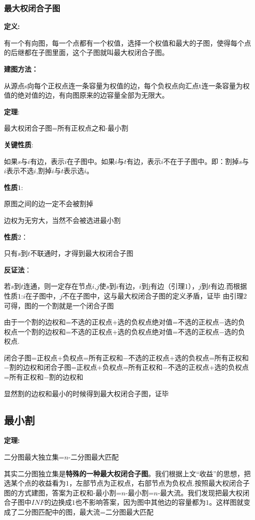 \documentclass[12pt, a4paper, oneside]{ctexart}
\begin{document}
\subsubsection{最大权闭合子图}
\textbf{定义:}
\par
\qquad  有一个有向图，每一个点都有一个权值，选择一个权值和最大的子图，使得每个点的后继都在子图里面，这个子图就叫最大权闭合子图。\par
\textbf{建图方法：}
\par
\qquad  从源点s向每个正权点连一条容量为权值的边，每个负权点向汇点t连一条容量为权值的绝对值的边，有向图原来的边容量全部为无限大。\par
\textbf{定理}:
\par
\qquad  最大权闭合子图=所有正权点之和-最小割\par
\textbf{关键性质}:
\par
\qquad  如果$s$与$i$有边，表示$i$在子图中。如果$i$与$t$有边，表示$i$不在于子图中。即：割掉$s$与$i$表示不选$i$,割掉$i$与$t$表示选$i$。\par
\textbf{性质$1$}:
\par
\qquad  原图之间的边一定不会被割掉\par
 边权为无穷大，当然不会被选进最小割\par
\textbf{性质$2$}：
\par
\qquad  只有$s$到$t$不联通时，才得到最大权闭合子图\par
\textbf{反证法}：
\par
\qquad  若$s$到$t$连通，则一定存在节点$i$,$j$使$s$到$i$有边，$i$到j有边（引理$1$），$j$到$t$有边.而根据性质$1$:$i$在子图中，$j$不在子图中，这与最大权闭合子图的定义矛盾，证毕
由引理$2$可得，图的一个割就是一个闭合子图\par
由于一个割的边权和=不选的正权点+选的负权点绝对值=不选的正权点−选的负权点一个割的边权和=不选的正权点+选的负权点绝对值=不选的正权点−选的负权点.\par
闭合子图=正权点+负权点=所有正权和−不选的正权点+选的负权点=所有正权和−割的边权和闭合子图=正权点+负权点=所有正权和−不选的正权点+选的负权点=所有正权和−割的边权和\par
显然割的边权和最小的时候得到最大权闭合子图，证毕

\newpage
\subsection{最小割}
\textbf{定理:} \par
\qquad  二分图最大独立集=$n$-二分图最大匹配\par
\qquad  其实二分图独立集是\textbf{特殊的一种最大权闭合子图}。我们根据上文“收益”的思想，把选某个点的收益看为$1$，左部节点为正权点，右部节点为负权点.按照最大权闭合子图的方式建图，答案为正权和-最小割=$n$-最小割=$n$-最大流。我们发现把最大权闭合子图中$INF$的边换成$1$也不影响答案，因为图中其他边的容量都为$1$。这样图就变成了二分图匹配中的图，最大流=二分图最大匹配
\end{document}

